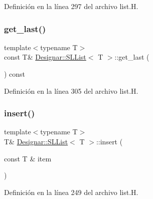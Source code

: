 Definición en la línea 297 del archivo list.\+H.

\mbox{\label{class_designar_1_1_s_l_list_add24dd761d9c1ed77a028889beb560c2}} 
\subsubsection{\texorpdfstring{get\+\_\+last()}{get\_last()}\hspace{0.1cm}{\footnotesize\ttfamily [2/2]}}
{\footnotesize\ttfamily template$<$typename T$>$ \\
const T\& \hyperlink{class_designar_1_1_s_l_list}{Designar\+::\+S\+L\+List}$<$ T $>$\+::get\+\_\+last (\begin{DoxyParamCaption}{ }\end{DoxyParamCaption}) const\hspace{0.3cm}{\ttfamily [inline]}}



Definición en la línea 305 del archivo list.\+H.

\mbox{\label{class_designar_1_1_s_l_list_a4a016c1bb14040d6abb8b8eee81b71e9}} 
\subsubsection{\texorpdfstring{insert()}{insert()}\hspace{0.1cm}{\footnotesize\ttfamily [1/2]}}
{\footnotesize\ttfamily template$<$typename T$>$ \\
T\& \hyperlink{class_designar_1_1_s_l_list}{Designar\+::\+S\+L\+List}$<$ T $>$\+::insert (\begin{DoxyParamCaption}\item[{const T \&}]{item }\end{DoxyParamCaption})\hspace{0.3cm}{\ttfamily [inline]}}



Definición en la línea 249 del archivo list.\+H.

\mbox{\label{class_designar_1_1_s_l_list_aea19d4f4eed343c1fe28517de0368be9}} 

